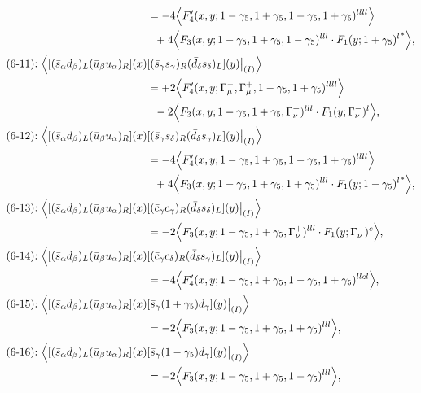 \begin{align}
&=
-4\Big\langle F_4'(x,y;1-\gamma_5,1+\gamma_5,1-\gamma_5,1+\gamma_5)^{llll}\Big\rangle
\notag\\*&\ \ 
 + 4\Big\langle F_3(x,y;1-\gamma_5,1+\gamma_5,1-\gamma_5)^{lll} \cdot {F_1(y;1+\gamma_5)^l}^*\Big\rangle,
\\
\mbox{(6-11):}\ 
\Big\langle
[(\bar s_\alpha d_\beta)_L(\bar u_\beta u_\alpha)_R](x)&
[(\bar s_\gamma s_\gamma)_R(\bar d_\delta s_\delta)_L](y)\big|_{(I)}
\Big\rangle
\notag\\*
&=
 + 2\Big\langle F_4'(x,y;\Gamma_\mu^-,\Gamma_\mu^+,1-\gamma_5,1+\gamma_5)^{llll}\Big\rangle
\notag\\*&\ \ 
-2\Big\langle F_3(x,y;1-\gamma_5,1+\gamma_5,\Gamma_\nu^+)^{lll} \cdot F_1(y;\Gamma_\nu^-)^l\Big\rangle,
\\
\mbox{(6-12):}\ 
\Big\langle
[(\bar s_\alpha d_\beta)_L(\bar u_\beta u_\alpha)_R](x)&
[(\bar s_\gamma s_\delta)_R(\bar d_\delta s_\gamma)_L](y)\big|_{(I)}
\Big\rangle
\notag\\*
&=
-4\Big\langle F_4'(x,y;1-\gamma_5,1+\gamma_5,1-\gamma_5,1+\gamma_5)^{llll}\Big\rangle
\notag\\*&\ \ 
 + 4\Big\langle F_3(x,y;1-\gamma_5,1+\gamma_5,1+\gamma_5)^{lll} \cdot {F_1(y;1-\gamma_5)^l}^*\Big\rangle,
\\
\mbox{(6-13):}\ 
\Big\langle
[(\bar s_\alpha d_\beta)_L(\bar u_\beta u_\alpha)_R](x)&
[(\bar c_\gamma c_\gamma)_R(\bar d_\delta s_\delta)_L](y)\big|_{(I)}
\Big\rangle
\notag\\*
&=
-2\Big\langle F_3(x,y;1-\gamma_5,1+\gamma_5,\Gamma_\nu^+)^{lll} \cdot F_1(y;\Gamma_\nu^-)^c\Big\rangle,
\\
\mbox{(6-14):}\ 
\Big\langle
[(\bar s_\alpha d_\beta)_L(\bar u_\beta u_\alpha)_R](x)&
[(\bar c_\gamma c_\delta)_R(\bar d_\delta s_\gamma)_L](y)\big|_{(I)}
\Big\rangle
\notag\\*
&=
-4\Big\langle F_4'(x,y;1-\gamma_5,1+\gamma_5,1-\gamma_5,1+\gamma_5)^{llcl}\Big\rangle,
\\
\mbox{(6-15):}\ 
\Big\langle
[(\bar s_\alpha d_\beta)_L(\bar u_\beta u_\alpha)_R](x)&
[\bar s_\gamma (1 + \gamma_5) d_\gamma](y)\big|_{(I)}
\Big\rangle
\notag\\*
&=
-2\Big\langle F_3(x,y;1-\gamma_5,1+\gamma_5,1+\gamma_5)^{lll}\Big\rangle,
\\
\mbox{(6-16):}\ 
\Big\langle
[(\bar s_\alpha d_\beta)_L(\bar u_\beta u_\alpha)_R](x)&
[\bar s_\gamma (1 - \gamma_5) d_\gamma](y)\big|_{(I)}
\Big\rangle
\notag\\*
&=
-2\Big\langle F_3(x,y;1-\gamma_5,1+\gamma_5,1-\gamma_5)^{lll}\Big\rangle,

\end{align}
